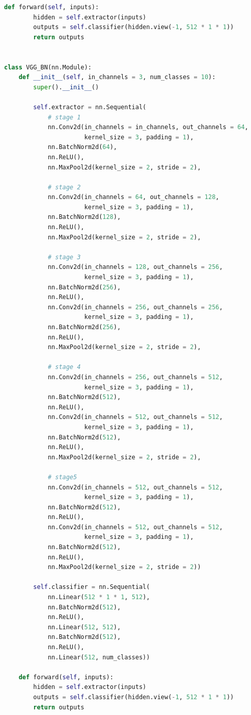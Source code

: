 \documentclass{article}
\begin{document}
\begin{lstlisting}[language=python]
    def forward(self, inputs):
        hidden = self.extractor(inputs)
        outputs = self.classifier(hidden.view(-1, 512 * 1 * 1))
        return outputs


class VGG_BN(nn.Module):
    def __init__(self, in_channels = 3, num_classes = 10):
        super().__init__()

        self.extractor = nn.Sequential(
            # stage 1
            nn.Conv2d(in_channels = in_channels, out_channels = 64, 
                      kernel_size = 3, padding = 1),
            nn.BatchNorm2d(64),
            nn.ReLU(),
            nn.MaxPool2d(kernel_size = 2, stride = 2),

            # stage 2
            nn.Conv2d(in_channels = 64, out_channels = 128, 
                      kernel_size = 3, padding = 1),
            nn.BatchNorm2d(128),
            nn.ReLU(),
            nn.MaxPool2d(kernel_size = 2, stride = 2),

            # stage 3
            nn.Conv2d(in_channels = 128, out_channels = 256, 
                      kernel_size = 3, padding = 1),
            nn.BatchNorm2d(256),
            nn.ReLU(),
            nn.Conv2d(in_channels = 256, out_channels = 256, 
                      kernel_size = 3, padding = 1),
            nn.BatchNorm2d(256),
            nn.ReLU(),
            nn.MaxPool2d(kernel_size = 2, stride = 2),

            # stage 4
            nn.Conv2d(in_channels = 256, out_channels = 512, 
                      kernel_size = 3, padding = 1),
            nn.BatchNorm2d(512),
            nn.ReLU(),
            nn.Conv2d(in_channels = 512, out_channels = 512, 
                      kernel_size = 3, padding = 1),
            nn.BatchNorm2d(512),
            nn.ReLU(),
            nn.MaxPool2d(kernel_size = 2, stride = 2),

            # stage5
            nn.Conv2d(in_channels = 512, out_channels = 512, 
                      kernel_size = 3, padding = 1),
            nn.BatchNorm2d(512),
            nn.ReLU(),
            nn.Conv2d(in_channels = 512, out_channels = 512, 
                      kernel_size = 3, padding = 1),
            nn.BatchNorm2d(512),
            nn.ReLU(),
            nn.MaxPool2d(kernel_size = 2, stride = 2))

        self.classifier = nn.Sequential(
            nn.Linear(512 * 1 * 1, 512),
            nn.BatchNorm2d(512),
            nn.ReLU(),
            nn.Linear(512, 512),
            nn.BatchNorm2d(512),
            nn.ReLU(),
            nn.Linear(512, num_classes))

    def forward(self, inputs):
        hidden = self.extractor(inputs)
        outputs = self.classifier(hidden.view(-1, 512 * 1 * 1))
        return outputs
\end{lstlisting}
	
\end{document}
